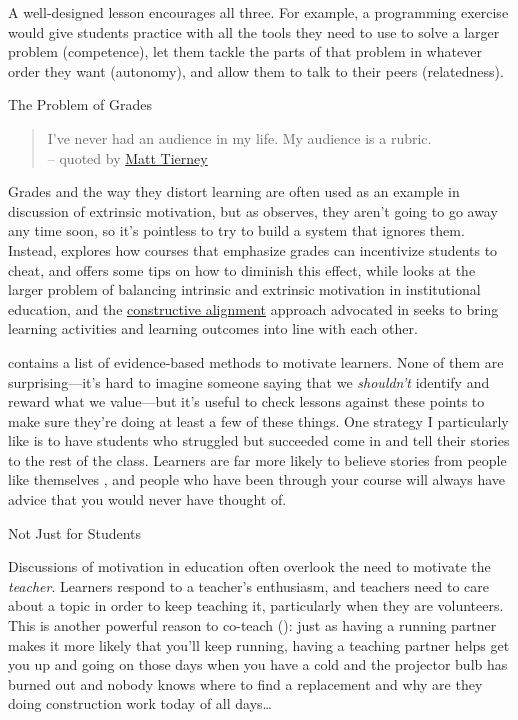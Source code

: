 \noindent
A well-designed lesson encourages all three.  For example, a
programming exercise would give students practice with all the tools
they need to use to solve a larger problem (competence), let them
tackle the parts of that problem in whatever order they want
(autonomy), and allow them to talk to their peers (relatedness).

\begin{callout}{The Problem of Grades}

  \begin{quote}
    I've never had an audience in my life. My audience is a rubric. \\
    -- quoted by \href{https://twitter.com/figuralities/status/987330064571387906}{Matt Tierney}
  \end{quote}

  Grades and the way they distort learning are often used as an
  example in discussion of extrinsic motivation, but as
  \cite{Mill2016a} observes, they aren't going to go away any time
  soon, so it's pointless to try to build a system that ignores them.
  Instead, \cite{Lang2013} explores how courses that emphasize grades
  can incentivize students to cheat, and offers some tips on how to
  diminish this effect, while \cite{Covi2017} looks at the larger
  problem of balancing intrinsic and extrinsic motivation in
  institutional education, and the
  \href{https://en.wikipedia.org/wiki/Constructive_alignment}{constructive
    alignment} approach advocated in \cite{Bigg2011} seeks to bring
  learning activities and learning outcomes into line with each other.

\end{callout}

\cite{Ambr2010} contains a list of evidence-based methods to motivate
learners. None of them are surprising---it's hard to imagine someone
saying that we \emph{shouldn't} identify and reward what we
value---but it's useful to check lessons against these points to make
sure they're doing at least a few of these things.  One strategy I
particularly like is to have students who struggled but succeeded come
in and tell their stories to the rest of the class.  Learners are far
more likely to believe stories from people like themselves
\cite{Mill2016a}, and people who have been through your course will
always have advice that you would never have thought of.

\begin{callout}{Not Just for Students}

  Discussions of motivation in education often overlook the need to
  motivate the \emph{teacher}. Learners respond to a teacher's
  enthusiasm, and teachers need to care about a topic in order to keep
  teaching it, particularly when they are volunteers.  This is another
  powerful reason to co-teach (): just as
  having a running partner makes it more likely that you'll keep
  running, having a teaching partner helps get you up and going on
  those days when you have a cold and the projector bulb has burned
  out and nobody knows where to find a replacement and why are they
  doing construction work today of all days{\ldots}

\end{callout}


